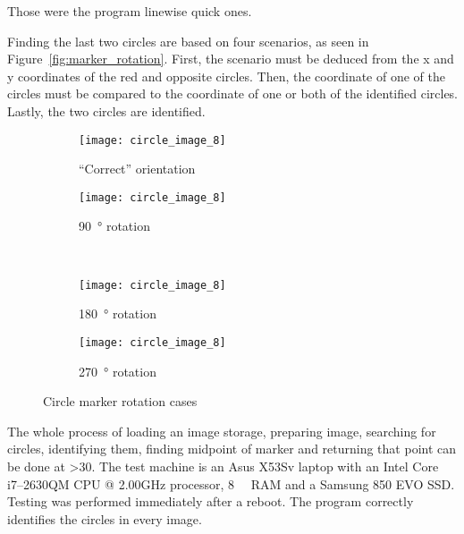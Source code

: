 Those were the program linewise quick ones.

Finding the last two circles are based on four scenarios, as seen in Figure~\vref{fig:marker_rotation}.
First, the scenario must be deduced from the x and y coordinates of the red and opposite circles.
Then, the coordinate of one of the circles must be compared to the coordinate of one or both of the identified circles.
Lastly, the two circles are identified.

\begin{figure}[ht]
\centering
\begin{subfigure}[b]{0.45\linewidth}
\centering
    \texttt{[image: circle\_image\_8]}
    \caption{``Correct'' orientation}
\label{fig:marker_rotation_1}
\end{subfigure}
\begin{subfigure}[b]{0.45\linewidth}
\centering
    \texttt{[image: circle\_image\_8]}
    \caption{\SI{90}{\degree} rotation}
\label{fig:marker_rotation_2}
\end{subfigure}\\
\begin{subfigure}[b]{0.45\linewidth}
\centering
    \texttt{[image: circle\_image\_8]}
    \caption{\SI{180}{\degree} rotation}
\label{fig:marker_rotation_3}
\end{subfigure}
\begin{subfigure}[b]{0.45\linewidth}
\centering
    \texttt{[image: circle\_image\_8]}
    \caption{\SI{270}{\degree} rotation}
\label{fig:marker_rotation_4}
\end{subfigure}
\caption{Circle marker rotation cases}
\label{fig:marker_rotation}
\end{figure}

The whole process of loading an image storage, preparing image, searching for circles, identifying them,
finding midpoint of marker and returning that point can be done at \SI{>30}{\fps}.
The test machine is an Asus X53Sv laptop with an Intel Core i7--2630QM CPU @ 2.00GHz processor, \SI{8}{\giga\byte} RAM and a Samsung 850 EVO SSD.\@
Testing was performed immediately after a reboot.
The program correctly identifies the circles in every image.
